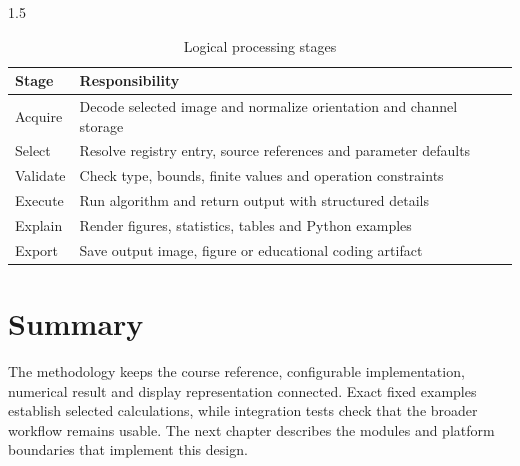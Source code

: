 \begin{spacing}{1.5}
\begin{table}[htbp]\centering\small
\caption{Logical processing stages}
\begin{tabularx}{\textwidth}{XX}
\toprule
\textbf{Stage} & \textbf{Responsibility}\\\midrule
Acquire & Decode selected image and normalize orientation and channel storage\\
Select & Resolve registry entry, source references and parameter defaults\\
Validate & Check type, bounds, finite values and operation constraints\\
Execute & Run algorithm and return output with structured details\\
Explain & Render figures, statistics, tables and Python examples\\
Export & Save output image, figure or educational coding artifact\\
\bottomrule\end{tabularx}\end{table}
\section{Summary}
The methodology keeps the course reference, configurable implementation, numerical result and display representation connected. Exact fixed examples establish selected calculations, while integration tests check that the broader workflow remains usable. The next chapter describes the modules and platform boundaries that implement this design.

\end{spacing}